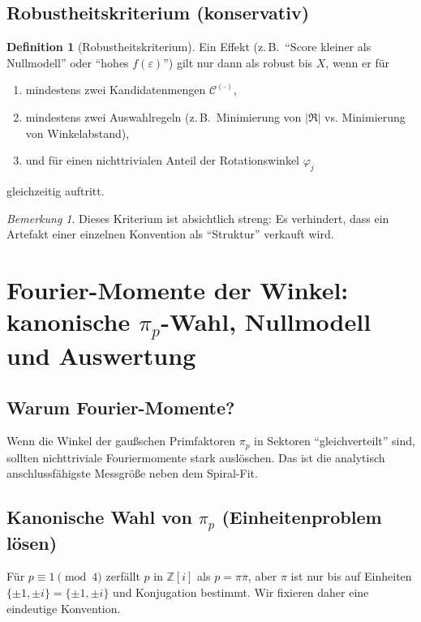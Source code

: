 \documentclass[a4paper,11pt]{article}
\theoremstyle{definition}
\newtheorem{definition}[satz]{Definition}
\theoremstyle{remark}
\newtheorem{bemerkung}[satz]{Bemerkung}
\newcommand{\Zi}{\mathbb{Z}[i]}
\newcommand{\unit}{\{\pm 1,\pm i\}}
\begin{document}
	\subsection{Robustheitskriterium (konservativ)}
	\begin{definition}[Robustheitskriterium]
		Ein Effekt (z.\,B.\ ``Score kleiner als Nullmodell'' oder ``hohes \(f(\varepsilon)\)'') gilt nur dann als robust bis \(X\),
		wenn er für
		\begin{enumerate}
			\item mindestens zwei Kandidatenmengen \(\mathcal{C}^{(\cdot)}\),
			\item mindestens zwei Auswahlregeln (z.\,B.\ Minimierung von \(|\Re|\) vs. Minimierung von Winkelabstand),
			\item und für einen nichttrivialen Anteil der Rotationswinkel \(\varphi_j\)
		\end{enumerate}
		gleichzeitig auftritt.
	\end{definition}
	
	\begin{bemerkung}
		Dieses Kriterium ist absichtlich streng: Es verhindert, dass ein Artefakt einer einzelnen Konvention als ``Struktur'' verkauft wird.
	\end{bemerkung}
	
	
	
	\section{Fourier-Momente der Winkel: kanonische \texorpdfstring{$\pi_p$}{pi\_p}-Wahl, Nullmodell und Auswertung}
	\label{sec:fourier}
	
	\subsection{Warum Fourier-Momente?}
	Wenn die Winkel der gaußschen Primfaktoren \(\pi_p\) in Sektoren ``gleichverteilt'' sind, sollten nichttriviale
	Fouriermomente stark auslöschen. Das ist die analytisch anschlussfähigste Messgröße neben dem Spiral-Fit.
	
	\subsection{Kanonische Wahl von \(\pi_p\) (Einheitenproblem lösen)}
	Für \(p\equiv 1\pmod 4\) zerfällt \(p\) in \(\Zi\) als \(p=\pi\overline{\pi}\), aber \(\pi\) ist nur bis auf Einheiten \(\unit=\{\pm1,\pm i\}\)
	und Konjugation bestimmt. Wir fixieren daher eine eindeutige Konvention.
	
\end{document}
